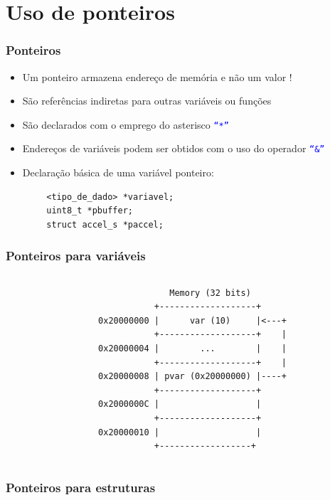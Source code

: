 \documentclass{beamer}
\begin{document}
\section{Uso de ponteiros}

\begin{frame}[fragile]
	\frametitle{Ponteiros}
	\begin{itemize}
		\item Um ponteiro armazena endereço de memória e não um valor !
		\item São referências indiretas para outras variáveis ou funções
		\item São declarados com o emprego do asterisco \texttt{\textcolor{blue}{``*''}}
		\item Endereços de variáveis podem ser obtidos com o uso do operador \texttt{\textcolor{blue}{``\&''}}
		\item Declaração básica de uma variável ponteiro:
	\end{itemize}
    {\footnotesize
	\begin{verbatim}
        <tipo_de_dado> *variavel;
        uint8_t *pbuffer;
        struct accel_s *paccel;
	\end{verbatim}
    }
\end{frame}

\begin{frame}[fragile]
	\frametitle{Ponteiros para variáveis}
	\begin{columns}[T] %
	\begin{column}{.50\textwidth}
		
	\end{column}%
	\hfill%
	\begin{column}{.50\textwidth}
	 {\tiny
	\begin{verbatim}
              Memory (32 bits)
           +-------------------+
0x20000000 |      var (10)     |<---+
           +-------------------+    |
0x20000004 |        ...        |    |
           +-------------------+    |
0x20000008 | pvar (0x20000000) |----+
           +-------------------+
0x2000000C |                   |
           +-------------------+
0x20000010 |                   |
           +------------------+
	\end{verbatim}
}
	\end{column}%
\end{columns}
\end{frame}

\begin{frame}[fragile]
	\frametitle{Ponteiros para estruturas}
	\begin{columns}[T] %
	\begin{column}{.75\textwidth}
		
	\end{column}%
	\hfill%
	\begin{column}{.25\textwidth}
	\end{column}%
\end{columns}
\end{frame}
\end{document}
